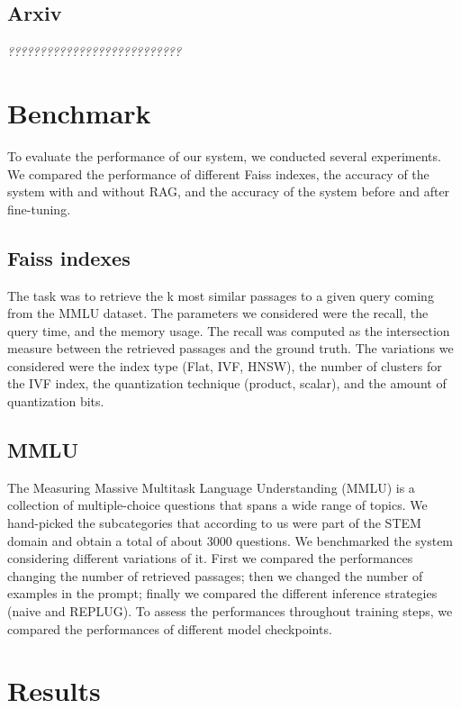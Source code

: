 \documentclass[11pt]{article}
\begin{document}
\subsection{Arxiv}

\textit{???????????????????????????}

\section{Benchmark}

To evaluate the performance of our system, we conducted several experiments.
We compared the performance of different Faiss indexes, the accuracy of the system with and without RAG,
and the accuracy of the system before and after fine-tuning.

\subsection{Faiss indexes}

The task was to retrieve the k most similar passages to a
given query coming from the MMLU dataset.
The parameters we considered were the recall, the query time, 
and the memory usage. 
The recall was computed as the intersection measure between the retrieved 
passages and the ground truth. 
The variations we considered were the index type (Flat, IVF, HNSW), the number 
of clusters for the IVF index, the quantization technique (product, scalar), and
the amount of quantization bits.

\subsection{MMLU}

The Measuring Massive Multitask Language Understanding (MMLU) is a collection of 
multiple-choice questions that spans a wide range of topics.
We hand-picked the subcategories that according to us were part of the STEM domain and
obtain a total of about 3000 questions.
We benchmarked the system considering different variations of it. First we compared the 
performances changing the number of retrieved passages; then we changed the number of 
examples in the prompt; finally we compared the different inference strategies (naive and REPLUG).
To assess the performances throughout training steps, we compared the performances of different 
model checkpoints.


\section{Results}
\end{document}
